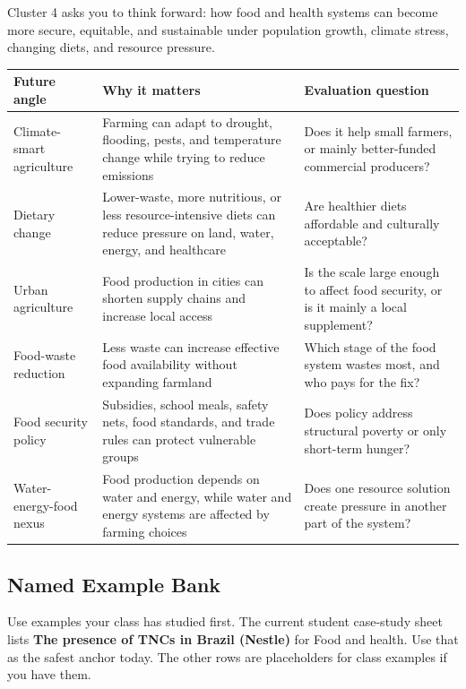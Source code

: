 \documentclass[11pt,a4paper]{article}
\newcommand{\term}[1]{\textcolor{HeadingBlue}{\textbf{#1}}}
\begin{document}
Cluster 4 asks you to think forward: how food and health systems can become
more secure, equitable, and sustainable under population growth, climate stress,
changing diets, and resource pressure.

\begin{tabularx}{\textwidth}{L{0.24\textwidth}Y Y}
\toprule
\textbf{Future angle} & \textbf{Why it matters} & \textbf{Evaluation question} \\
\midrule
Climate-smart agriculture & Farming can adapt to drought, flooding, pests, and
temperature change while trying to reduce emissions & Does it help small
farmers, or mainly better-funded commercial producers? \\
Dietary change & Lower-waste, more nutritious, or less resource-intensive diets
can reduce pressure on land, water, energy, and healthcare & Are healthier diets
affordable and culturally acceptable? \\
Urban agriculture & Food production in cities can shorten supply chains and
increase local access & Is the scale large enough to affect food security, or
is it mainly a local supplement? \\
Food-waste reduction & Less waste can increase effective food availability
without expanding farmland & Which stage of the food system wastes most, and
who pays for the fix? \\
Food security policy & Subsidies, school meals, safety nets, food standards,
and trade rules can protect vulnerable groups & Does policy address structural
poverty or only short-term hunger? \\
Water-energy-food nexus & Food production depends on water and energy, while
water and energy systems are affected by farming choices & Does one resource
solution create pressure in another part of the system? \\
\bottomrule
\end{tabularx}

\subsection{Named Example Bank}

Use examples your class has studied first. The current student case-study sheet
lists \term{The presence of TNCs in Brazil (Nestle)} for Food and health. Use
that as the safest anchor today. The other rows are placeholders for class
examples if you have them.
\end{document}
